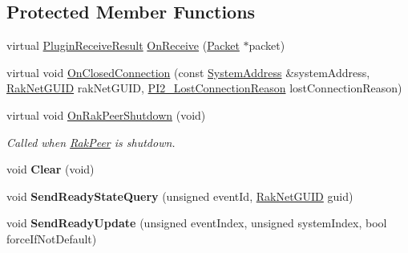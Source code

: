 \subsection*{Protected Member Functions}
\begin{DoxyCompactItemize}
\item 
virtual \hyperlink{group___p_l_u_g_i_n___i_n_t_e_r_f_a_c_e___g_r_o_u_p_ga89998adaafb29e5d879113b992161085}{Plugin\-Receive\-Result} \hyperlink{class_rak_net_1_1_ready_event_a2dd5308b4ee75a877c53404477a3c637}{On\-Receive} (\hyperlink{struct_rak_net_1_1_packet}{Packet} $\ast$packet)
\item 
virtual void \hyperlink{class_rak_net_1_1_ready_event_acf26f69ce62bcbfe5077c61aa2c40f45}{On\-Closed\-Connection} (const \hyperlink{struct_rak_net_1_1_system_address}{System\-Address} \&system\-Address, \hyperlink{struct_rak_net_1_1_rak_net_g_u_i_d}{Rak\-Net\-G\-U\-I\-D} rak\-Net\-G\-U\-I\-D, \hyperlink{group___p_l_u_g_i_n___i_n_t_e_r_f_a_c_e___g_r_o_u_p_ga376cc546fd6892c2ead48cd51796c8b8}{P\-I2\-\_\-\-Lost\-Connection\-Reason} lost\-Connection\-Reason)
\item 
\hypertarget{class_rak_net_1_1_ready_event_a26a546e1fad47a20aee022aad42446df}{virtual void \hyperlink{class_rak_net_1_1_ready_event_a26a546e1fad47a20aee022aad42446df}{On\-Rak\-Peer\-Shutdown} (void)}\label{class_rak_net_1_1_ready_event_a26a546e1fad47a20aee022aad42446df}

\begin{DoxyCompactList}\small\item\em Called when \hyperlink{class_rak_net_1_1_rak_peer}{Rak\-Peer} is shutdown. \end{DoxyCompactList}\item 
\hypertarget{class_rak_net_1_1_ready_event_abfdeb476677809e346340b594ba3e8df}{void {\bfseries Clear} (void)}\label{class_rak_net_1_1_ready_event_abfdeb476677809e346340b594ba3e8df}

\item 
\hypertarget{class_rak_net_1_1_ready_event_ad7d2bbcf84ec021a147e02ab38bd0779}{void {\bfseries Send\-Ready\-State\-Query} (unsigned event\-Id, \hyperlink{struct_rak_net_1_1_rak_net_g_u_i_d}{Rak\-Net\-G\-U\-I\-D} guid)}\label{class_rak_net_1_1_ready_event_ad7d2bbcf84ec021a147e02ab38bd0779}

\item 
\hypertarget{class_rak_net_1_1_ready_event_af520e55ca73e3ae18d46d57fe3bd4cc7}{void {\bfseries Send\-Ready\-Update} (unsigned event\-Index, unsigned system\-Index, bool force\-If\-Not\-Default)}\label{class_rak_net_1_1_ready_event_af520e55ca73e3ae18d46d57fe3bd4cc7}


\end{DoxyCompactItemize}
